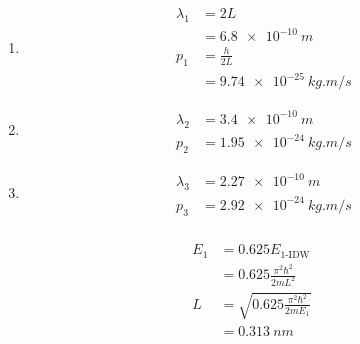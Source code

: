 \documentclass{article}
\begin{document}
\begin{enumerate}
  \item

        \begin{align*}
          \lambda_1 & = 2 L                    \\
                    & = \qty{6.8e-10}{m}       \\
          p_1       & = \frac{h}{2 L}          \\
                    & = \qty{9.74e-25}{kg.m/s}
        \end{align*}

  \item

        \begin{align*}
          \lambda_2 & = \qty{3.4e-10}{m}       \\
          p_2       & = \qty{1.95e-24}{kg.m/s}
        \end{align*}

  \item

        \begin{align*}
          \lambda_3 & = \qty{2.27e-10}{m}      \\
          p_3       & = \qty{2.92e-24}{kg.m/s}
        \end{align*}
\end{enumerate}

\setcounter{subsubsection}{20}
\subsubsection{}

\begin{align*}
  E_1 & = 0.625 E_\text{1-IDW}                       \\
      & = 0.625 \frac{\pi^2 \hbar^2}{2 m L^2}        \\
  L   & = \sqrt{0.625 \frac{\pi^2 \hbar^2}{2 m E_1}} \\
      & = \qty{0.313}{nm}
\end{align*}

\setcounter{subsubsection}{22}
\subsubsection{}
\end{document}
